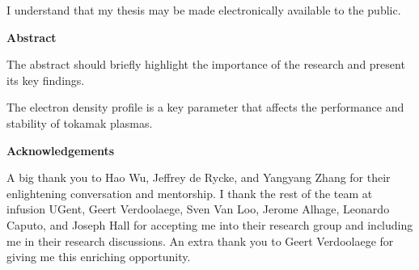   \noindent
I understand that my thesis may be made electronically available to the public.

\cleardoublepage
{}    %

\begin{center}\textbf{Abstract}\end{center}

The abstract should briefly highlight the importance of the research and present its key findings. 

The electron density profile is a key parameter that affects the performance and stability of tokamak plasmas. 

\cleardoublepage
{}    %

\begin{center}\textbf{Acknowledgements}\end{center}

A big thank you to Hao Wu, Jeffrey de Rycke, and Yangyang Zhang for their enlightening conversation and mentorship. I thank the rest of the team at infusion UGent, Geert Verdoolaege, Sven Van Loo, Jerome Alhage, Leonardo Caputo, and Joseph Hall for accepting me into their research group and including me in their research discussions. An extra thank you to Geert Verdoolaege for giving me this enriching opportunity.
\cleardoublepage
{}    %



\renewcommand\contentsname{Table of Contents}
\tableofcontents
\cleardoublepage
{}    %

\listoffigures
\cleardoublepage
{}		%

